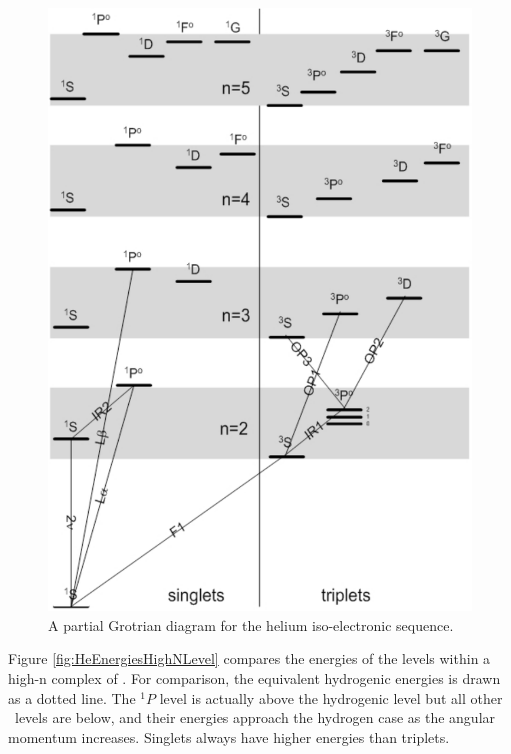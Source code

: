 \begin{figure}
\centering
\label{fig:helium_energy_levels}
\includegraphics[scale=0.7]{helium_energy_levels}
\caption[He iso sequence energy levels]{A partial Grotrian diagram for the helium iso-electronic sequence.}
\end{figure}


Figure \ref{fig:HeEnergiesHighNLevel} compares the energies of the levels within a high-n complex
of \hei.  For comparison, the equivalent hydrogenic energies is drawn as
a dotted line.  The $^1P$ level is actually above the hydrogenic level but
all other \hei\ levels are below, and their energies approach the hydrogen
case as the angular momentum increases.  Singlets always have higher energies
than triplets.

